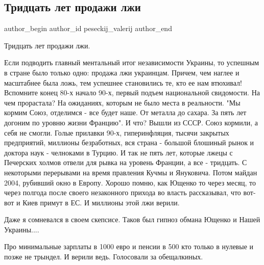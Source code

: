  
 
 
 
 
 
\subsection{Тридцать лет продажи лжи}
\label{sec:25_08_2021.fb.peseckij_valerij.1.nezavisimost_prodazha_lzhi}
 
\ifcmt
 author_begin
   author_id peseckij_valerij
 author_end
\fi

Тридцать лет продажи лжи.

Если подводить главный ментальный итог независимости Украины, то успешным в
стране было только одно: продажа лжи украинцам. Причем, чем наглее и масштабнее
была ложь, тем успешнее становились те, кто ее нам втюхивал! Вспомните конец
80-х начало 90-х, первый подъем национальной свидомости. На чем прорастала? На
ожиданиях, которым не было места в реальности. "Мы кормим Союз, отделимся - все
будет наше. От металла до сахара. За пять лет догоним по уровню жизни Францию".
И что? Вышли из СССР. Союз кормили, а себя не смогли. Голые прилавки 90-х,
гиперинфляция, тысячи закрытых предприятий, миллионы безработных, вся страна -
большой блошиный рынок и доктора наук - челноками в Турцию. И так не пять лет,
которые лжецы с Печерских холмов отвели для рывка на уровень Франции, а все -
тридцать. С некоторыми перерывами на время правления Кучмы и Януковича. Потом
майдан 2004, рубивший окно в Европу. Хорошо помню, как Ющенко то через месяц,
то через полгода после своего незаконного прихода во власть рассказывал, что
вот-вот и Киев примут в ЕС. И миллионы этой лжи верили. 

Даже я сомневался в своем скепсисе. Таков был гипноз обмана Ющенко и Нашей
Украины....

Про минимальные зарплаты в 1000 евро и пенсии в 500 кто только в нулевые и
позже не трындел. И верили ведь. Голосовали за обещалкиных.

